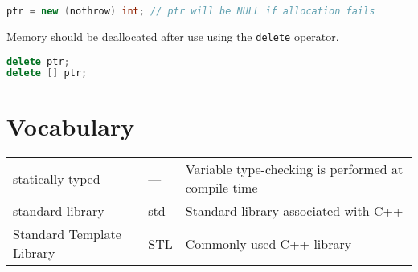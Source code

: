 \documentclass[10pt]{article}
\begin{document}
\begin{lstlisting}[language=C++]
ptr = new (nothrow) int; // ptr will be NULL if allocation fails
\end{lstlisting}

Memory should be deallocated after use using the \texttt{delete} operator.

\begin{lstlisting}[language=C++]
delete ptr;
delete [] ptr;
\end{lstlisting}

\section{Vocabulary}

\begin{tabular}{l l l}
statically-typed & --- & Variable type-checking is performed at compile time\\
standard library & std & Standard library associated with C++\\
Standard Template Library & STL & Commonly-used C++ library\\
\end{tabular}
\end{document}
